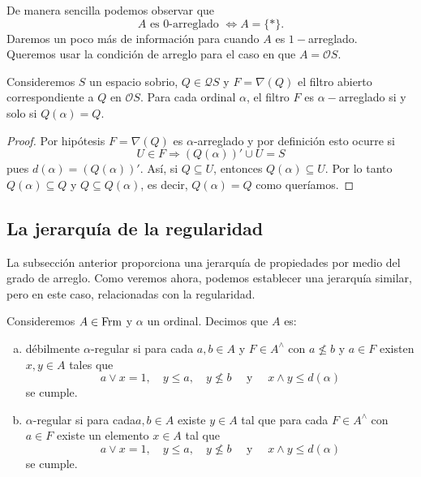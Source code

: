 De manera sencilla podemos observar que
\[
A \mbox{ es } 0\mbox{-arreglado }\Leftrightarrow A=\{*\}.
\]
Daremos un poco más de información para cuando $A$ es $1-$arreglado.\\

Queremos usar la condición de arreglo para el caso en que $A=\mathcal{O}S$.

\begin{lem}\label{Lema8.2.3}
    Consideremos $S$ un espacio sobrio, $Q\in \mathcal{Q}S$ y $F=\nabla(Q)$ el filtro abierto correspondiente a $Q$ en $\mathcal{O}S$. Para cada ordinal $\alpha$, el filtro $F$ es $\alpha-$arreglado si y solo si $Q(\alpha)=Q$.
\end{lem}

\begin{proof}
    Por hipótesis $F=\nabla (Q)$ es $\alpha$-arreglado y por definición esto ocurre si 
    \[
    U\in F\Rightarrow (Q(\alpha))'\cup U=S
    \]
    pues $d(\alpha)=(Q(\alpha))'$. Así, si $Q\subseteq U$, entonces $Q(\alpha)\subseteq U$. Por lo tanto $Q(\alpha)\subseteq Q$ y $Q\subseteq Q(\alpha)$, es decir, $Q(\alpha)=Q$ como queríamos.
\end{proof}

\subsection{La jerarquía de la regularidad}

La subsección anterior proporciona una jerarquía de propiedades por medio del grado de arreglo. Como veremos ahora, podemos establecer una jerarquía similar, pero en este caso, relacionadas con la regularidad.

\begin{dfn}\label{Definición8.3.1}
    Consideremos $A\in \mathrm{Frm}$ y $\alpha$ un ordinal. Decimos que $A$ es:
    \begin{enumerate}[a)]
        \item débilmente $\alpha$-regular si para cada $a, b\in A$ y $F\in A^\wedge$ con $a\nleq b$ y $a\in F$ existen $x, y\in A$ tales que 
        \[
        a\vee x=1,\quad y\leq a,\quad y\nleq b\quad \mbox{ y }\quad x\wedge y\leq d(\alpha)
        \]
        se cumple.
        \item $\alpha$-regular si para cada$a,b\in A$ existe $y\in A$ tal que para cada $F\in A^\wedge$ con $a\in F$ existe un elemento $x\in A$ tal que 
        \[
        a\vee x=1,\quad y\leq a,\quad y\nleq b\quad \mbox{ y }\quad x\wedge y\leq d(\alpha)
        \]
        se cumple.
    \end{enumerate}
\end{dfn}

